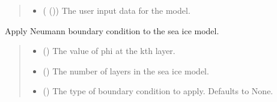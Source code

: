 \documentclass[a4paper,11pt,english,openany]{sphinxmanual}
\begin{document}
\begin{fulllineitems}
\begin{fulllineitems}
\begin{quote}
\begin{description}
\begin{itemize}
\item {} 
\sphinxAtStartPar
{} ({\hyperref[\detokenize{api/spyice.parameters.user_input:spyice.parameters.user_input.UserInput}]{}} ()) \textendash{} The user input data for the model.

\end{itemize}

\end{description}\end{quote}

\end{fulllineitems}


\begin{fulllineitems}
\label{\detokenize{api/spyice.models.sea_ice_model:spyice.models.sea_ice_model.SeaIceModel.bc_neumann}}
\pysigstartsignatures
{}
\pysigstopsignatures
\sphinxAtStartPar
Apply Neumann boundary condition to the sea ice model.
\begin{quote}\begin{description}
\begin{itemize}
\item {} 
\sphinxAtStartPar
{} () \textendash{} The value of phi at the k\sphinxhyphen{}th layer.

\item {} 
\sphinxAtStartPar
{} () \textendash{} The number of layers in the sea ice model.

\item {} 
\sphinxAtStartPar
{} (\sphinxstyleliteralemphasis{\sphinxupquote{, }}) \textendash{} The type of boundary condition to apply. Defaults to None.


\end{itemize}
\end{description}
\end{quote}
\end{fulllineitems}
\end{fulllineitems}
\end{document}
